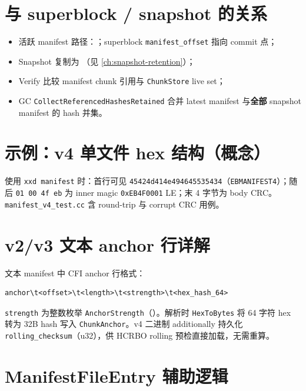 \section{与 superblock / snapshot 的关系}

\begin{itemize}
  \item 活跃 manifest 路径：；superblock \texttt{manifest\_offset} 指向 commit 点；
  \item Snapshot 复制为 （见 \cref{ch:snapshot-retention}）；
  \item Verify 比较 manifest chunk 引用与 \texttt{ChunkStore} live set；
  \item GC \texttt{CollectReferencedHashesRetained} 合并 latest manifest 与\textbf{全部} snapshot manifest 的 hash 并集。
\end{itemize}

\section{示例：v4 单文件 hex 结构（概念）}

\begin{designbox}[调试提示]
使用 \texttt{xxd manifest} 时：首行可见 \texttt{45424d414e494645535434}（\texttt{EBMANIFEST4}）；随后 \texttt{01 00 4f eb} 为 inner magic \texttt{0xEB4F0001} LE；末 4 字节为 body CRC。\\
\texttt{manifest\_v4\_test.cc} 含 round-trip 与 corrupt CRC 用例。
\end{designbox}

\section{v2/v3 文本 anchor 行详解}

文本 manifest 中 CFI anchor 行格式：
\begin{verbatim}
anchor\t<offset>\t<length>\t<strength>\t<hex_hash_64>
\end{verbatim}

\texttt{strength} 为整数枚举 \texttt{AnchorStrength}（）。解析时 \texttt{HexToBytes} 将 64 字符 hex 转为 32B hash 写入 \texttt{ChunkAnchor}。v4 二进制 additionally 持久化 \texttt{rolling\_checksum}（u32），供 HCRBO rolling 预检直接加载，无需重算。

\section{ManifestFileEntry 辅助逻辑}

